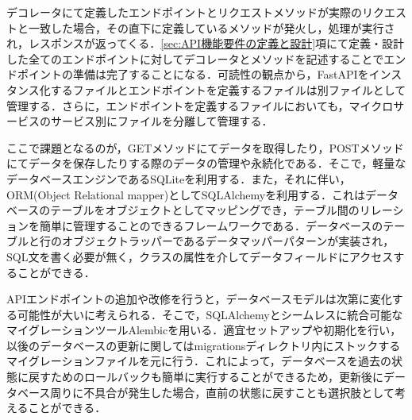           \par デコレータにて定義したエンドポイントとリクエストメソッドが実際のリクエストと一致した場合，その直下に定義しているメソッドが発火し，処理が実行され，レスポンスが返ってくる．\ref{sec:API機能要件の定義と設計}項にて定義・設計した全てのエンドポイントに対してデコレータとメソッドを記述することでエンドポイントの準備は完了することになる．可読性の観点から，FastAPIをインスタンス化するファイルとエンドポイントを定義するファイルは別ファイルとして管理する．さらに，エンドポイントを定義するファイルにおいても，マイクロサービスのサービス別にファイルを分離して管理する．
          \par ここで課題となるのが，GETメソッドにてデータを取得したり，POSTメソッドにてデータを保存したりする際のデータの管理や永続化である．そこで，軽量なデータベースエンジンであるSQLite\cite{sqlite}を利用する．また，それに伴い，ORM(Object Relational mapper)としてSQLAlchemy\cite{sqlalchemy}を利用する．これはデータベースのテーブルをオブジェクトとしてマッピングでき，テーブル間のリレーションを簡単に管理することのできるフレームワークである．データベースのテーブルと行のオブジェクトラッパーであるデータマッパーパターンが実装され，SQL文を書く必要が無く，クラスの属性を介してデータフィールドにアクセスすることができる．
          \par APIエンドポイントの追加や改修を行うと，データベースモデルは次第に変化する可能性が大いに考えられる．そこで，SQLAlchemyとシームレスに統合可能なマイグレーションツールAlembic\cite{alembic}を用いる．適宜セットアップや初期化を行い，以後のデータベースの更新に関してはmigrationsディレクトリ内にストックするマイグレーションファイルを元に行う．これによって，データベースを過去の状態に戻すためのロールバックも簡単に実行することができるため，更新後にデータベース周りに不具合が発生した場合，直前の状態に戻すことも選択肢として考えることができる．
          
